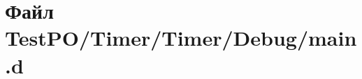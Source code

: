 \hypertarget{_timer_2_timer_2_debug_2main_8d}{}\section{Файл Test\+P\+O/\+Timer/\+Timer/\+Debug/main.d}
\label{_timer_2_timer_2_debug_2main_8d}
